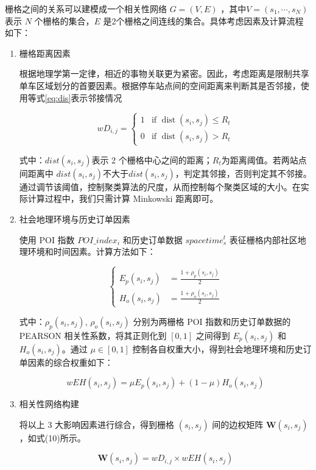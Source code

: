 \documentclass[12pt,a4paper,oneside]{ctexart}
\begin{document}
栅格之间的关系可以建模成一个相关性网络 $G =(V, E)$ ，其中$V =(s_1,\cdots, s_N)$ 表示 $N$ 个栅格的集合，$E$ 是2个栅格之间连线的集合。具体考虑因素及计算流程如下：
\begin{enumerate}
\item 栅格距离因素

根据地理学第一定律，相近的事物关联更为紧密。因此，考虑距离是限制共享单车区域划分的首要因素。根据停车站点间的空间距离来判断其是否邻接，使用等式\ref{eq:dis}表示邻接情况

\begin{equation}\label{eq:dis}
wD_{i,j} = 
\begin{cases} 
1 & \text{if } \operatorname{dist}(s_i, s_j) \leq R_t \\
0 & \text{if } \operatorname{dist}(s_i, s_j) > R_t 
\end{cases}
\end{equation}

式中：$dist(s_i,s_j)$表示 2 个栅格中心之间的距离；$R_t$为距离阈值。若两站点间距离中 $dist(s_i,s_j)$不大于$dist(s_i,s_j)$，判定其邻接，否则判定其不邻接。通过调节该阈值，控制聚类算法的尺度，从而控制每个聚类区域的大小。在实际计算过程中，我们只需计算 Minkowski 距离即可。

\item 社会地理环境与历史订单因素

使用 POI 指数 $POI\_index_i$ 和历史订单数据 $spacetime_s^t$ 表征栅格内部社区地理环境和时间因素。计算方法如下：

\begin{equation}
\left\{
\begin{aligned}
E_p(s_i, s_j) &= \frac{1 + \rho_p(s_i, s_j)}{2} \\
H_o(s_i, s_j) &= \frac{1 + \rho_o(s_i, s_j)}{2}
\end{aligned}
\right.
\end{equation}

式中：$\rho_p(s_i, s_j)$, $\rho_o(s_i, s_j)$ 分别为两栅格 POI 指数和历史订单数据的 PEARSON 相关性系数，将其正则化到 $[0,1]$ 之间得到 $E_p(s_i, s_j)$ 和 $H_o(s_i, s_j)$。通过 $\mu \in [0,1]$ 控制各自权重大小，得到社会地理环境和历史订单因素的综合权重如下：

\begin{equation}
wEH(s_i, s_j) = \mu E_p(s_i, s_j) + (1 - \mu) H_o(s_i, s_j)
\end{equation}

\item 相关性网络构建

将以上 3 大影响因素进行综合，得到栅格 $(s_i, s_j)$ 间的边权矩阵 $\boldsymbol{W}(s_i, s_j)$，如式(10)所示。

\begin{equation}
\boldsymbol{W}(s_i, s_j) = wD_{i,j} \times wEH(s_i, s_j)
\end{equation}
\end{enumerate}
\end{document}
